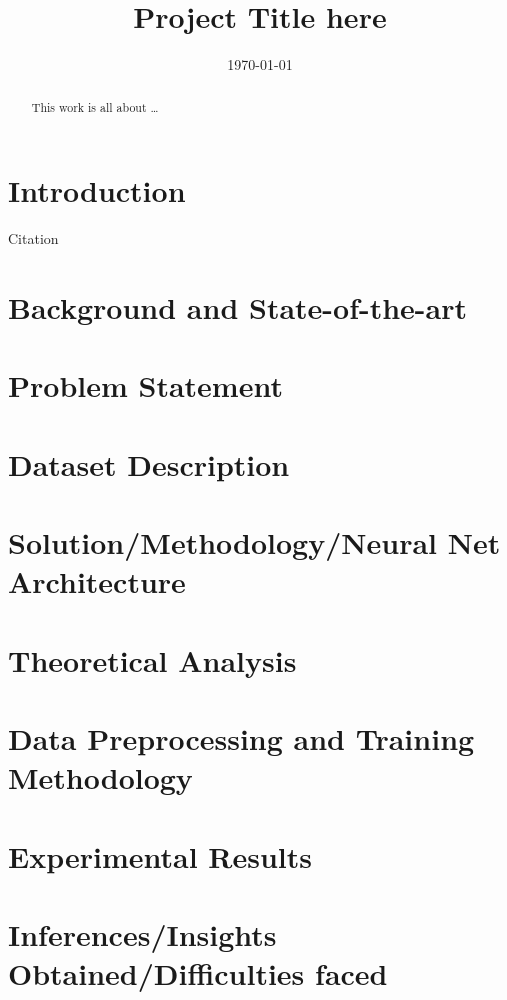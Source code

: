 \documentclass{ecsproject}     %
\begin{document}
\frontmatter
\title      {Project Title here}
\date       {\today}
\maketitle
\begin{abstract}
This work is all about \dots
\end{abstract}
\tableofcontents
\listoffigures
\listoftables
\mainmatter

\chapter{Introduction} \label{Chapter:Introduction}
Citation \cite{Gunn:2001:pdflatex}

\chapter{Background and State-of-the-art}

\chapter{Problem Statement}

\chapter{Dataset Description}

\chapter{Solution/Methodology/Neural Net Architecture}

\chapter{Theoretical Analysis}

\chapter{Data Preprocessing and Training Methodology}

\chapter{Experimental Results}

\chapter{Inferences/Insights Obtained/Difficulties faced}




\end{document}

